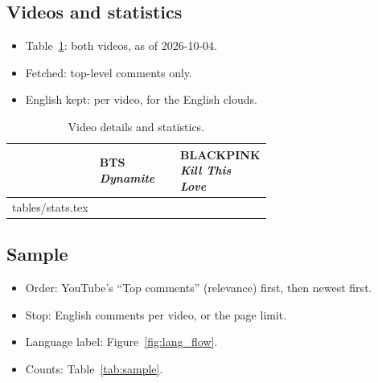 \documentclass[11pt]{article}
\makeatletter
\newcommand{\gentable}[1]{\@@input #1 }
\newcommand{\vidA}{\texorpdfstring{BTS \emph{Dynamite}}{BTS Dynamite}}
\newcommand{\vidB}{\texorpdfstring{BLACKPINK \emph{Kill This Love}}{BLACKPINK Kill This Love}}
\makeatother
\begin{document}
\subsection{Videos and statistics}

\begin{itemize}
  \item Table~\ref{tab:stats}: both videos, as of 2026-10-04.
  \item Fetched: top-level comments only.
  \item English kept: \nEnVideoA{} per video, for the English clouds.
\end{itemize}

\begin{table}[H]
\centering
\small
\begin{tabular}{@{}lp{0.32\linewidth}p{0.32\linewidth}@{}}
  \toprule
  & \vidA{} & \vidB{} \\
  \midrule
  \gentable{tables/stats.tex}
  \bottomrule
\end{tabular}
\caption{Video details and statistics.}\label{tab:stats}
\end{table}

\subsection{Sample}

\begin{itemize}
  \item Order: YouTube's ``Top comments'' (relevance) first, then newest first.
  \item Stop: \nEnVideoA{} English comments per video, or the page limit.
  \item Language label: Figure~\ref{fig:lang_flow}.
  \item Counts: Table~\ref{tab:sample}.
\end{itemize}
\end{document}
